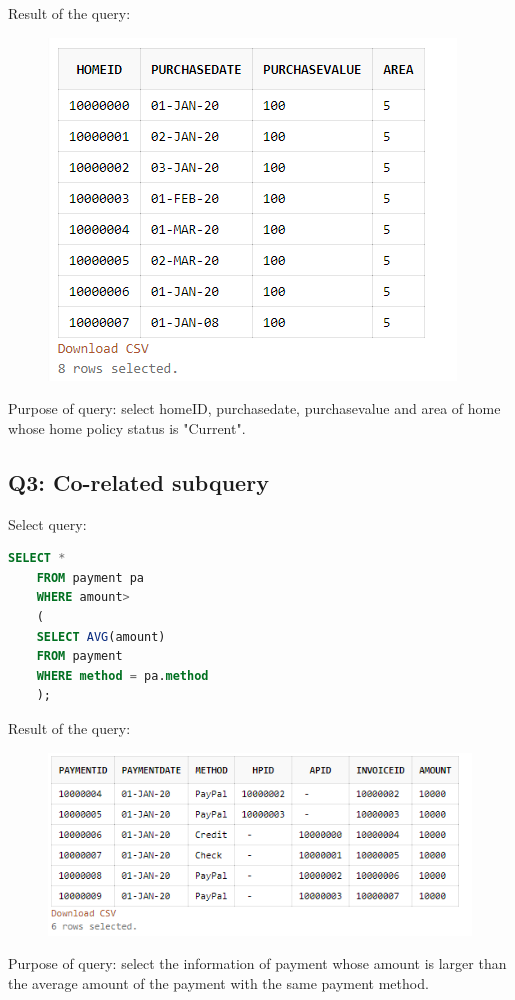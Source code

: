 \documentclass[12pt,english, openany]{book}
\begin{document}
Result of the query:
    \begin{figure}[H]
        \centering
        \includegraphics[scale=0.6]{h2.png}
    \end{figure}
    
Purpose of query: select homeID, purchasedate, purchasevalue and area of home whose home policy status is "Current".

\subsection{Q3: Co-related subquery}
Select query: 
\begin{lstlisting}[language=SQL]
    SELECT *
    FROM payment pa
    WHERE amount> 
    (
    SELECT AVG(amount)
    FROM payment
    WHERE method = pa.method
    );
\end{lstlisting}

Result of the query:
    \begin{figure}[H]
        \centering
        \includegraphics[scale=0.6]{h3.png}
    \end{figure}
    
Purpose of query: select the information of payment whose amount is larger than the average amount of the payment with the same payment method.
\end{document}
